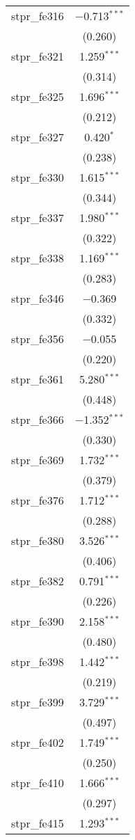 \begin{table}[!htbp]
\begin{tabular}{@{\extracolsep{5pt}}lc}
  stpr\_fe316 & $-$0.713$^{***}$ \\ 
  & (0.260) \\ 
  stpr\_fe321 & 1.259$^{***}$ \\ 
  & (0.314) \\ 
  stpr\_fe325 & 1.696$^{***}$ \\ 
  & (0.212) \\ 
  stpr\_fe327 & 0.420$^{*}$ \\ 
  & (0.238) \\ 
  stpr\_fe330 & 1.615$^{***}$ \\ 
  & (0.344) \\ 
  stpr\_fe337 & 1.980$^{***}$ \\ 
  & (0.322) \\ 
  stpr\_fe338 & 1.169$^{***}$ \\ 
  & (0.283) \\ 
  stpr\_fe346 & $-$0.369 \\ 
  & (0.332) \\ 
  stpr\_fe356 & $-$0.055 \\ 
  & (0.220) \\ 
  stpr\_fe361 & 5.280$^{***}$ \\ 
  & (0.448) \\ 
  stpr\_fe366 & $-$1.352$^{***}$ \\ 
  & (0.330) \\ 
  stpr\_fe369 & 1.732$^{***}$ \\ 
  & (0.379) \\ 
  stpr\_fe376 & 1.712$^{***}$ \\ 
  & (0.288) \\ 
  stpr\_fe380 & 3.526$^{***}$ \\ 
  & (0.406) \\ 
  stpr\_fe382 & 0.791$^{***}$ \\ 
  & (0.226) \\ 
  stpr\_fe390 & 2.158$^{***}$ \\ 
  & (0.480) \\ 
  stpr\_fe398 & 1.442$^{***}$ \\ 
  & (0.219) \\ 
  stpr\_fe399 & 3.729$^{***}$ \\ 
  & (0.497) \\ 
  stpr\_fe402 & 1.749$^{***}$ \\ 
  & (0.250) \\ 
  stpr\_fe410 & 1.666$^{***}$ \\ 
  & (0.297) \\ 
  stpr\_fe415 & 1.293$^{***}$ \\ 

\end{tabular}
\end{table}
